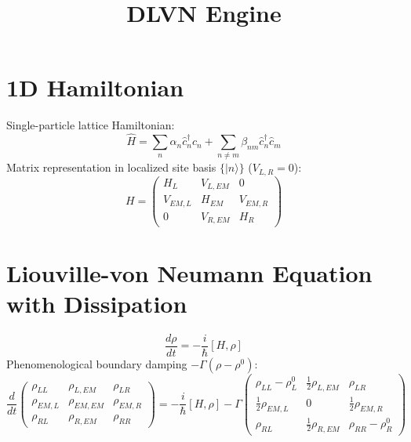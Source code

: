 \documentclass[12pt,a4paper]{article}
\title{\textbf{DLVN Engine}}
\date{}
\begin{document}
\maketitle

\section{1D Hamiltonian}
Single-particle lattice Hamiltonian:
\begin{equation}
    \hat{H} = \sum_n \alpha_n \hat{c}_n^\dagger \hat{c}_n + \sum_{n \neq m} \beta_{nm} \hat{c}_n^\dagger \hat{c}_m
\end{equation}
Matrix representation in localized site basis $\{|n\rangle\}$ ($V_{L,R} = 0$):
\begin{equation}
    H = \begin{pmatrix}
        H_L & V_{L,EM} & 0 \\
        V_{EM,L} & H_{EM} & V_{EM,R} \\
        0 & V_{R,EM} & H_R
    \end{pmatrix}
\end{equation}

\section{Liouville-von Neumann Equation with Dissipation}
\begin{equation}
    \frac{d\rho}{dt} = -\frac{i}{\hbar} [H, \rho]
\end{equation}
Phenomenological boundary damping $-\Gamma(\rho - \rho^0)$:
\begin{equation}
    \frac{d}{dt} \begin{pmatrix}
        \rho_{LL} & \rho_{L,EM} & \rho_{LR} \\
        \rho_{EM,L} & \rho_{EM,EM} & \rho_{EM,R} \\
        \rho_{RL} & \rho_{R,EM} & \rho_{RR}
    \end{pmatrix} = -\frac{i}{\hbar} [H, \rho] - \Gamma \begin{pmatrix}
        \rho_{LL} - \rho^0_L & \frac{1}{2}\rho_{L,EM} & \rho_{LR} \\
        \frac{1}{2}\rho_{EM,L} & 0 & \frac{1}{2}\rho_{EM,R} \\
        \rho_{RL} & \frac{1}{2}\rho_{R,EM} & \rho_{RR} - \rho^0_R
    \end{pmatrix}
\end{equation}
\end{document}
